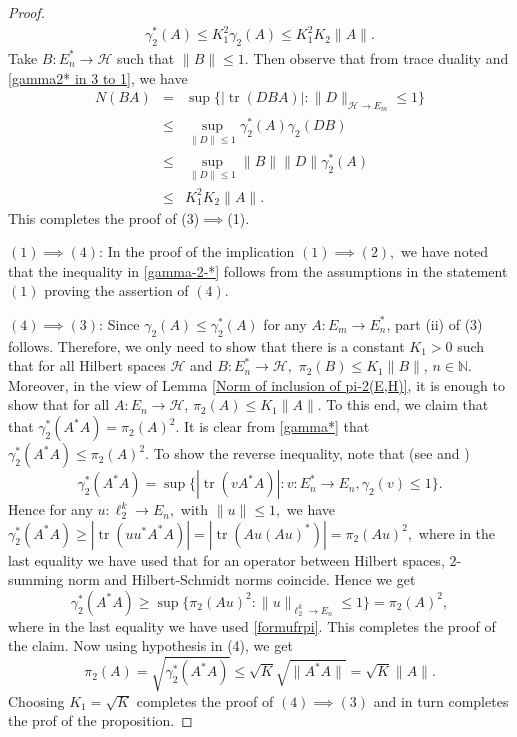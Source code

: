 \documentclass[a4paper,oneside,11pt, reqno]{amsart}
\numberwithin{equation}{section}
\theoremstyle{plain}
\begin{document}
\begin{proof}
\begin{eqnarray}
\gamma_2^*(A)\leqslant K_1^2 \gamma_2(A)\leqslant K_1^2K_2\|A\|.
\end{eqnarray}
Take $B:E_n^*\to\mathcal{H}$ such that $\|B\| \leqslant 1.$ Then observe that from trace duality and \eqref{gamma2* in 3 to 1}, we have
\begin{eqnarray*}
N(BA) &=& \sup\{|\operatorname{tr}(DBA)|:\|D\|_{{\mathcal{H}\to E_m}} \leqslant 1\}\\ 
& \leqslant & \sup_{\|D\|\leqslant 1} \gamma_2^*(A) \gamma_2(DB)\\
& \leqslant & \sup_{\|D\|\leqslant 1} \|B\| \|D\| \gamma_2^*(A)\\
& \leqslant & K_1^2 K_2 \|A\|. 
\end{eqnarray*}
This completes the proof of (3)$\implies$(1).

\textbf{$(1) \implies (4)$}: In the proof of the implication $(1)\implies (2),$ we have noted that the inequality in \eqref{gamma-2-*} follows from the assumptions in the statement $(1)$ proving the assertion of $(4)$. 

\textbf{$(4) \implies (3)$}: Since  $\gamma_2(A)\leqslant \gamma_2^*(A)$ for any $A:E_m\to E_n^*$, part (ii) of (3) follows. Therefore, we only need to show that there is a constant $K_1 > 0$ such that for all Hilbert spaces $\mathcal{H}$ and $B:E_n^*\to\mathcal{H},$ $\pi_2(B)\leqslant K_1\|B\|$, $n\in\mathbb{N}$. Moreover, 
in the view of Lemma \ref{Norm of inclusion of pi-2(E,H)},
it is enough to show that for all $A:E_n\to\mathcal{H}$, $\pi_2(A)\leqslant K_1\|A\|.$ To this end, we claim that that $\gamma_2^*(A^*A)=\pi_2(A)^2.$ 
It is clear from \eqref{gamma*} that $\gamma_2^*(A^*A)\leqslant \pi_2(A)^2.$ To show the reverse inequality, note that (see \cite[Chapter 2]{Pisier-factorization} and  \cite[Chapter 7]{DJT})
\[\gamma_2^*(A^*A)=\sup\{|\operatorname{tr}(vA^*A)|:v:E_n^*\to E_n,\gamma_2(v)\leqslant 1\}.\] Hence for any $u:\ell_2^k\to E_n,$ with $\|u\|\leqslant 1,$ we have $\gamma_2^*(A^*A)\geqslant |\operatorname{tr}(uu^*A^*A)|=|\operatorname{tr}(Au(Au)^*)|=\pi_2(Au)^2,$ where in the last equality we have used that for an operator between Hilbert spaces, $2$-summing norm and Hilbert-Schmidt norms coincide. Hence we get \[\gamma_2^*(A^*A)\geqslant\sup\{\pi_2(Au)^2:\|u\|_{\ell_2^k\to E_n}\leqslant 1\}=\pi_2(A)^2,\] where in the last equality we have used \eqref{formufrpi}. This completes the proof of the claim. Now using hypothesis in (4), we get 
$$\pi_2(A)=\sqrt{\gamma_2^*(A^*A)}\leqslant \sqrt{K} \sqrt{\|A^*A\|}=\sqrt{K}\|A\|.$$
Choosing $K_1=\sqrt{K}$ completes the proof of $(4) \implies (3)$ and in turn completes the prof of the proposition.
\end{proof}
\end{document}
